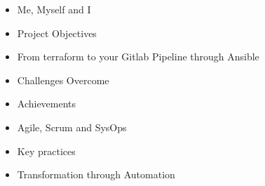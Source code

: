 \documentclass{article}
\begin{document}
\begin{itemize}
    \item Me, Myself and I 
    \item Project Objectives 
    \item From terraform to your Gitlab Pipeline through Ansible
    \item Challenges Overcome
    \item Achievements
    \item Agile, Scrum and SysOps
    \item Key practices
    \item Transformation through Automation
\end{itemize}
\end{document}
